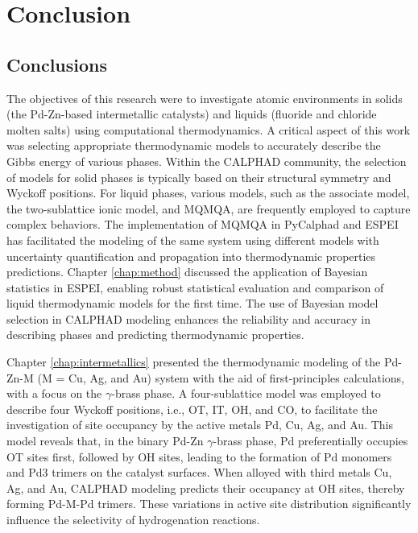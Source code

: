 \chapter{Conclusion} \label{chap:conclusion}

\section{Conclusions} \label{conclusion:sec:conclusions}
The objectives of this research were to investigate atomic environments in solids (the Pd-Zn-based intermetallic catalysts) and liquids (fluoride and chloride molten salts) using computational thermodynamics. A critical aspect of this work was selecting appropriate thermodynamic models to accurately describe the Gibbs energy of various phases. Within the CALPHAD community, the selection of models for solid phases is typically based on their structural symmetry and Wyckoff positions. For liquid phases, various models, such as the associate model, the two-sublattice ionic model, and MQMQA, are frequently employed to capture complex behaviors. The implementation of MQMQA in PyCalphad and ESPEI has facilitated the modeling of the same system using different models with uncertainty quantification and propagation into thermodynamic properties predictions. Chapter \ref{chap:method} discussed the application of Bayesian statistics in ESPEI, enabling robust statistical evaluation and comparison of liquid thermodynamic models for the first time. The use of Bayesian model selection in CALPHAD modeling enhances the reliability and accuracy in describing phases and predicting thermodynamic properties. 

Chapter \ref{chap:intermetallics} presented the thermodynamic modeling of the Pd-Zn-M (M = Cu, Ag, and Au) system with the aid of first-principles calculations, with a focus on the $\gamma$-brass phase. A four-sublattice model was employed to describe four Wyckoff positions, i.e., OT, IT, OH, and CO, to facilitate the investigation of site occupancy by the active metals Pd, Cu, Ag, and Au. This model reveals that, in the binary Pd-Zn $\gamma$-brass phase, Pd preferentially occupies OT sites first, followed by OH sites, leading to the formation of Pd monomers and Pd3 trimers on the catalyst surfaces. When alloyed with third metals Cu, Ag, and Au, CALPHAD modeling predicts their occupancy at OH sites, thereby forming Pd-M-Pd trimers. These variations in active site distribution significantly influence the selectivity of hydrogenation reactions.

